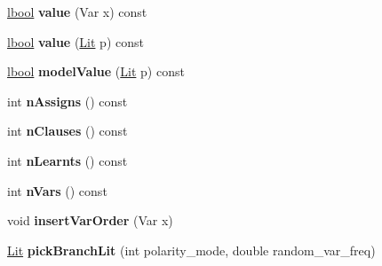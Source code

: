 \begin{DoxyCompactItemize}
\item 
\hypertarget{classminisat_1_1Solver_a6fb0f3f37c39c327ca85eaec1d68f2bd}{\hyperlink{classminisat_1_1lbool}{lbool} {\bfseries value} (\-Var x) const }\label{classminisat_1_1Solver_a6fb0f3f37c39c327ca85eaec1d68f2bd}

\item 
\hypertarget{classminisat_1_1Solver_a4b3148c900ed69f19bd686bbf05fb92d}{\hyperlink{classminisat_1_1lbool}{lbool} {\bfseries value} (\hyperlink{classminisat_1_1Lit}{\-Lit} p) const }\label{classminisat_1_1Solver_a4b3148c900ed69f19bd686bbf05fb92d}

\item 
\hypertarget{classminisat_1_1Solver_a4e115b4916b6420d7f20dcf95f609012}{\hyperlink{classminisat_1_1lbool}{lbool} {\bfseries model\-Value} (\hyperlink{classminisat_1_1Lit}{\-Lit} p) const }\label{classminisat_1_1Solver_a4e115b4916b6420d7f20dcf95f609012}

\item 
\hypertarget{classminisat_1_1Solver_a1d254d9313ac40750106fb133cb2ed7c}{int {\bfseries n\-Assigns} () const }\label{classminisat_1_1Solver_a1d254d9313ac40750106fb133cb2ed7c}

\item 
\hypertarget{classminisat_1_1Solver_a7f83bea6321151df4ac5de0cb86a1e5f}{int {\bfseries n\-Clauses} () const }\label{classminisat_1_1Solver_a7f83bea6321151df4ac5de0cb86a1e5f}

\item 
\hypertarget{classminisat_1_1Solver_a72343e73fe11cd3c0ab392aa437a35d4}{int {\bfseries n\-Learnts} () const }\label{classminisat_1_1Solver_a72343e73fe11cd3c0ab392aa437a35d4}

\item 
\hypertarget{classminisat_1_1Solver_a2809effd4082689e169a810561542ebd}{int {\bfseries n\-Vars} () const }\label{classminisat_1_1Solver_a2809effd4082689e169a810561542ebd}

\item 
\hypertarget{classminisat_1_1Solver_aca0943c1730650cb30741c3a9fc52fb0}{void {\bfseries insert\-Var\-Order} (\-Var x)}\label{classminisat_1_1Solver_aca0943c1730650cb30741c3a9fc52fb0}

\item 
\hypertarget{classminisat_1_1Solver_a3dbd0b4ebf3251b159041a99ca9c47b1}{\hyperlink{classminisat_1_1Lit}{\-Lit} {\bfseries pick\-Branch\-Lit} (int polarity\-\_\-mode, double random\-\_\-var\-\_\-freq)}\label{classminisat_1_1Solver_a3dbd0b4ebf3251b159041a99ca9c47b1}


\end{DoxyCompactItemize}
